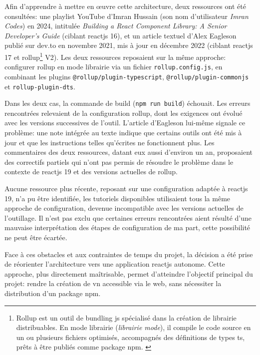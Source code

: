 Afin d'apprendre à mettre en \oe{}uvre cette architecture, deux ressources ont été consultées: une playlist YouTube d'Imran Hussain (son nom d'utilisateur \textit{Imran Codes}) en 2024, intitulée \textit{Building a React Component Library: A Senior Developer's Guide}\parencite{imran_codes_1_2024} (ciblant \gls{reactjs} 16), et un article textuel d'Alex Eagleson publié sur dev.to en novembre 2021, mis à jour en décembre 2022 \parencite{noauthor_how_2021} (ciblant \gls{reactjs} 17 et rollup\footnote{Rollup est un outil de bundling \gls{js} spécialisé dans la création de \gls{librairie} distribuables. En mode \gls{librairie} (\textit{\gls{librairie} mode}), il compile le code source en un ou plusieurs fichiers optimisés, accompagnés des définitions de types \gls{ts}, prêts à être publiés comme \gls{package} \gls{npm}. \parencite{noauthor_introduction_nodate}} V2). Les deux ressources reposaient sur la même approche: configurer rollup en mode \gls{librairie} via un fichier \texttt{rollup.config.js}, en combinant les plugins \texttt{@rollup/plugin-typescript}, \texttt{@rollup/plugin-commonjs} et \texttt{rollup-plugin-dts}.

Dans les deux cas, la commande de build (\texttt{npm run build}) échouait. Les erreurs rencontrées relevaient de la configuration rollup, dont les exigences ont évolué avec les versions successives de l'outil. L'article d'Eagleson lui-même signale ce problème: une note intégrée au texte indique que certains outils ont été mis à jour et que les instructions telles qu'écrites ne fonctionnent plus. \parencite{noauthor_how_2021} Les commentaires des deux ressources, datant eux aussi d'environ un an, proposaient des correctifs partiels qui n'ont pas permis de résoudre le problème dans le contexte de \gls{reactjs} 19 et des versions actuelles de rollup.

Aucune ressource plus récente, reposant sur une configuration adaptée à \gls{reactjs} 19, n'a pu être identifiée, les tutoriels disponibles utilisaient tous la même approche de configuration, devenue incompatible avec les versions actuelles de l'outillage. Il n'est pas exclu que certaines erreurs rencontrées aient résulté d'une mauvaise interprétation des étapes de configuration de ma part, cette possibilité ne peut être écartée.

Face à ces obstacles et aux contraintes de temps du projet, la décision a été prise de réorienter l'architecture vers une application \gls{reactjs} autonome. Cette approche, plus directement maîtrisable, permet d'atteindre l'objectif principal du projet: rendre la création de \gls{vn} accessible via le web, sans nécessiter la distribution d'un \gls{package} \gls{npm}.

